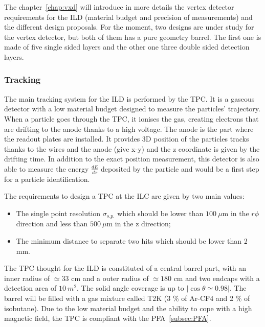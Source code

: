       The chapter~\ref{chap:vxd} will introduce in more details the vertex detector requirements for the \gls{ILD} (material budget and precision of measurements) and the different design proposals. 
      For the moment, two designs are under study for the vertex detector, but both of them has a pure geometry barrel.
      The first one is made of five single sided layers and the other one three double sided detection layers.

      \subsubsection{Tracking}

      The main tracking system for the \gls{ILD} is performed by the \gls{TPC}.
      It is a gaseous detector with a low material budget designed to measure the particles' trajectory.
      When a particle goes through the \gls{TPC}, it ionises the gas, creating electrons that are drifting to the anode thanks to a high voltage.
      The anode is the part where the readout plates are installed.
      It provides 3D position of the particles tracks thanks to the wires and the anode (give x-y) and the z coordinate is given by the drifting time.
      In addition to the exact position measurement, this detector is also able to measure the energy $\frac{dE}{dx}$ deposited by the particle and would be a first step for a particle identification.

      The requirements to design a \gls{TPC} at the \gls{ILC} are given by two main values: 
      
      \begin{itemize} 
        \item The single point resolution $\sigma_{s.p.}$ which should be lower than $100 \ \mu\text{m}$ in the $r\phi$ direction and less than $500 \ \mu\text{m}$ in the z direction;
        \item The minimum distance to separate two hits which should be lower than 2 mm.
      \end{itemize}

      The \gls{TPC} thought for the \gls{ILD} is constituted of a central barrel part, with an inner radius of $\simeq 33 \text{ cm}$ and a outer radius of $\simeq 180 \text{ cm}$ and two endcaps with a detection area of $10 \ m^2$. 
      The solid angle coverage is up to $|\cos{\theta} \simeq 0.98|$.
      The barrel will be filled with a gas mixture called T2K (3 \% of Ar-CF4 and 2 \% of isobutane).
      Due to the low material budget and the ability to cope with a high magnetic field, the \gls{TPC} is compliant with the \gls{PFA}~\ref{subsec:PFA}. 


